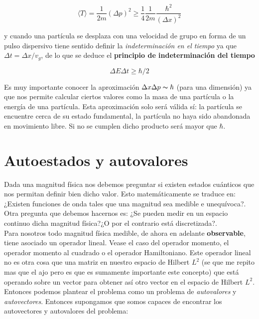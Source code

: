 \documentclass[12pt,a4paper]{article}
\numberwithin{equation}{section}
\numberwithin{figure}{section}
\begin{document}
\begin{equation}
\langle T \rangle = \dfrac{1}{2 m} (\Delta p)^2 \geq \dfrac{1}{4} \dfrac{1}{2m} \dfrac{\hbar^2}{(\Delta x)^2}
\end{equation}

y cuando una partícula se desplaza con una velocidad de grupo en forma de un pulso dispersivo tiene sentido definir la \textit{indeterminación en el tiempo} ya que $\Delta t = \Delta x/ v_g$, de lo que se deduce el \textbf{principio de indeterminación del tiempo}

\begin{equation}
\Delta E \Delta t \geq \hbar / 2
\end{equation}


Es muy importante conocer la aproximación $\Delta x \Delta p \thicksim \hbar$ (para una dimensión) ya que nos permite calcular ciertos valores como la masa de una partícula o la energía de una partícula. Esta aproximación solo será válida sí: la partícula se encuentre cerca de su estado fundamental, la partícula no haya sido abandonada en movimiento libre. Si no se cumplen dicho producto será mayor que $\hbar$. \\

\section{Autoestados y autovalores}

Dada una magnitud física nos debemos preguntar si existen estados cuánticos que nos permitan definir bien dicho valor. Esto matemáticamente se traduce en: ¿Existen funciones de onda tales que una magnitud sea medible e unequívoca?. Otra pregunta que debemos hacernos es: ¿Se pueden medir en un espacio continuo dicha magnitud física?¿O por el contrario está discretizada?. \\

Para nosotros todo magnitud física medible, de ahora en adelante \textbf{observable}, tiene asociado un operador lineal. Vease el caso del operador momento, el operador momento al cuadrado o el operador Hamiltoniano. Este operador lineal no es otra cosa que una matriz en nuestro espacio de Hilbert $L^2$ (se que me repito mas que el ajo pero es que es sumamente importante este concepto) que está operando sobre un vector para obtener así otro vector en el espacio de Hilbert $L^2$. Entonces podemos plantear el problema como un problema de \textit{autovalores} y \textit{autovectores}. Entonces supongamos que somos capaces de encontrar los autovectores y autovalores del problema:
\end{document}
